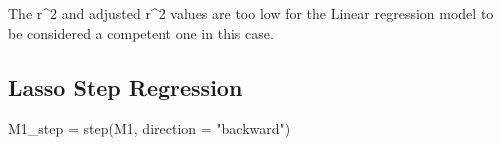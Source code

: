 \documentclass[
]{article}
\newenvironment{Shaded}{\begin{snugshade}}{\end{snugshade}}
\newcommand{\AttributeTok}[1]{\textcolor[rgb]{0.77,0.63,0.00}{#1}}
\newcommand{\FunctionTok}[1]{\textcolor[rgb]{0.00,0.00,0.00}{#1}}
\newcommand{\NormalTok}[1]{#1}
\newcommand{\OtherTok}[1]{\textcolor[rgb]{0.56,0.35,0.01}{#1}}
\newcommand{\StringTok}[1]{\textcolor[rgb]{0.31,0.60,0.02}{#1}}
\begin{document}
The r\^{}2 and adjusted r\^{}2 values are too low for the Linear
regression model to be considered a competent one in this case.

\hypertarget{lasso-step-regression}{%
\subsection{Lasso Step Regression}\label{lasso-step-regression}}

\begin{Shaded}
\begin{Highlighting}[]
\NormalTok{M1\_step }\OtherTok{=} \FunctionTok{step}\NormalTok{(M1, }\AttributeTok{direction =} \StringTok{"backward"}\NormalTok{)}
\end{Highlighting}
\end{Shaded}
\end{document}
